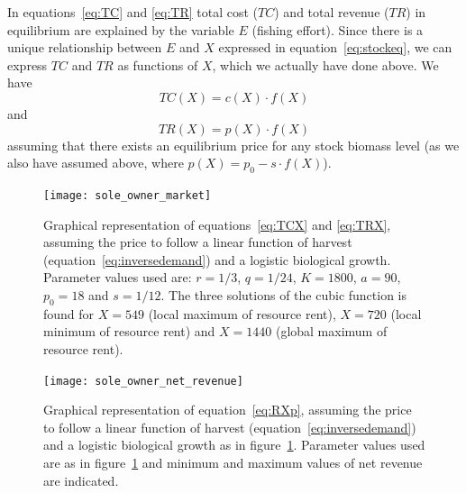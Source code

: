 \documentclass[11pt,fleqn]{book} %
\begin{document}
In equations~\ref{eq:TC} and \ref{eq:TR} total cost ($TC$) and total revenue ($TR$) in equilibrium are explained by the variable $E$ (fishing effort). Since there is a unique relationship between $E$ and $X$ expressed in equation~\ref{eq:stockeq}, we can express $TC$ and $TR$ as functions of $X$, which we actually have done above. We have
\begin{equation} 
\label{eq:TCX}
TC(X) = c(X) \cdot f(X)
\end{equation}
and
\begin{equation} 
\label{eq:TRX}
TR(X) = p(X) \cdot f(X)
\end{equation}
assuming that there exists an equilibrium price for any stock biomass level (as we also have assumed above, where $p(X) = p_0 - s \cdot f(X)$).

\begin{figure}[ht]
\centering
\texttt{[image: sole\_owner\_market]}
\caption{Graphical representation of equations~\ref{eq:TCX} and \ref{eq:TRX}, assuming the price to follow a linear function of harvest (equation~\ref{eq:inversedemand}) and a logistic biological growth. Parameter values used are: $r = 1/3$, $q = 1/24$, $K = 1800$, $a = 90$, $p_0 = 18$ and $s = 1/12$. The three solutions of the cubic function is found for $X = 549$ (local maximum of resource rent), $X = 720$ (local minimum of resource rent) and $X = 1440$ (global maximum of resource rent).} 
\label{fig:soleownermarket}
\end{figure}

\begin{figure}[ht]
\centering
\texttt{[image: sole\_owner\_net\_revenue]}
\caption{Graphical representation of equation~\ref{eq:RXp}, assuming the price to follow a linear function of harvest (equation~\ref{eq:inversedemand}) and a logistic biological growth as in figure~\ref{fig:soleownermarket}. Parameter values used are as in figure~\ref{fig:soleownermarket} and minimum and maximum values of net revenue are indicated.} 
\label{fig:soleownernetrevenue}
\end{figure}
\end{document}
